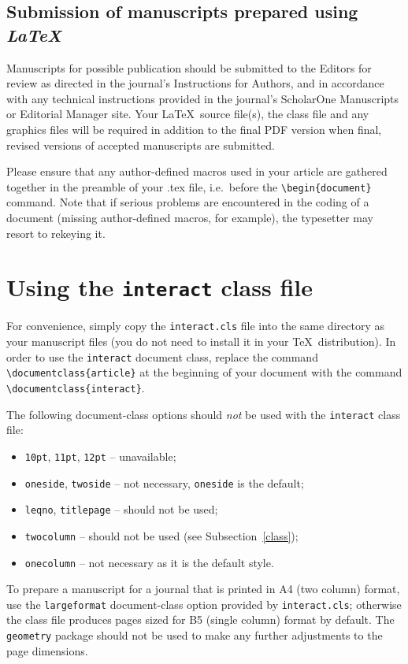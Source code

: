 \documentclass[]{interact}
\theoremstyle{plain}%
\theoremstyle{definition}
\theoremstyle{remark}
\begin{document}
\subsection{Submission of manuscripts prepared using \emph{\LaTeX}}

Manuscripts for possible publication should be submitted to the Editors for review as directed in the journal's Instructions for Authors, and in accordance with any technical instructions provided in the journal's ScholarOne Manuscripts or Editorial Manager site. Your \LaTeX\ source file(s), the class file and any graphics files will be required in addition to the final PDF version when final, revised versions of accepted manuscripts are submitted.

Please ensure that any author-defined macros used in your article are gathered together in the preamble of your .tex file, i.e.\ before the \verb"\begin{document}" command. Note that if serious problems are encountered in the coding of a document (missing author-defined macros, for example), the typesetter may resort to rekeying it.


\section{Using the \texttt{interact} class file}

For convenience, simply copy the \texttt{interact.cls} file into the same directory as your manuscript files (you do not need to install it in your \TeX\ distribution). In order to use the \texttt{interact} document class, replace the command \verb"\documentclass{article}" at the beginning of your document with the command \verb"\documentclass{interact}".

The following document-class options should \emph{not} be used with the \texttt{interact} class file:
\begin{itemize}
  \item \texttt{10pt}, \texttt{11pt}, \texttt{12pt} -- unavailable;
  \item \texttt{oneside}, \texttt{twoside} -- not necessary, \texttt{oneside} is the default;
  \item \texttt{leqno}, \texttt{titlepage} -- should not be used;
  \item \texttt{twocolumn} -- should not be used (see Subsection~\ref{class});
  \item \texttt{onecolumn} -- not necessary as it is the default style.
\end{itemize}
To prepare a manuscript for a journal that is printed in A4 (two column) format, use the \verb"largeformat" document-class option provided by \texttt{interact.cls}; otherwise the class file produces pages sized for B5 (single column) format by default. The \texttt{geometry} package should not be used to make any further adjustments to the page dimensions.
\end{document}
